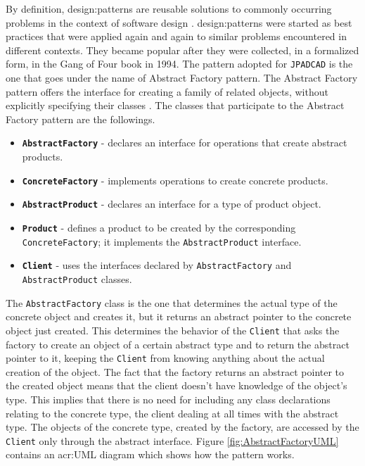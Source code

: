 \bigskip
\noindent
By definition, \gls{design:pattern}s are reusable solutions to commonly occurring problems in the context of software design \cite{wikiDesignPatterns}. \gls{design:pattern}s were started as best practices that were applied again and again to similar problems encountered in different contexts. They became popular after they were collected, in a formalized form, in the Gang of Four book in 1994. The pattern adopted for \lstinline[language=Java]!JPADCAD! is the one that goes under the name of Abstract Factory pattern. The Abstract Factory pattern offers the interface for creating a family of related objects, without explicitly specifying their classes \cite{wikiAbstractFactoryPattern}. The classes that participate to the Abstract Factory pattern are the followings.
%
\begin{itemize}
\renewcommand\labelitemi{\tiny$\blacksquare$}
\item \textbf{\texttt{AbstractFactory}} - declares an interface for operations that create abstract products.
\item \textbf{\texttt{ConcreteFactory}} - implements operations to create concrete products.
\item \textbf{\texttt{AbstractProduct}} - declares an interface for a type of product object.
\item \textbf{\texttt{Product}} - defines a product to be created by the corresponding \texttt{ConcreteFactory}; it implements the \texttt{AbstractProduct} interface.
\item \textbf{\texttt{Client}} - uses the interfaces declared by \texttt{AbstractFactory} and \texttt{AbstractProduct} classes.
\end{itemize}
%
The \texttt{AbstractFactory} class is the one that determines the actual type of the concrete object and creates it, but it returns an abstract pointer to the concrete object just created. This determines the behavior of the \texttt{Client} that asks the factory to create an object of a certain abstract type and to return the abstract pointer to it, keeping the \texttt{Client} from knowing anything about the actual creation of the object. The fact that the factory returns an abstract pointer to the created object means that the client doesn't have knowledge of the object's type. This implies that there is no need for including any class declarations relating to the concrete type, the client dealing at all times with the abstract type. The objects of the concrete type, created by the factory, are accessed by the \texttt{Client} only through the abstract interface. Figure \ref{fig:AbstractFactoryUML} contains an \gls{acr:UML} diagram which shows how the pattern works. 
